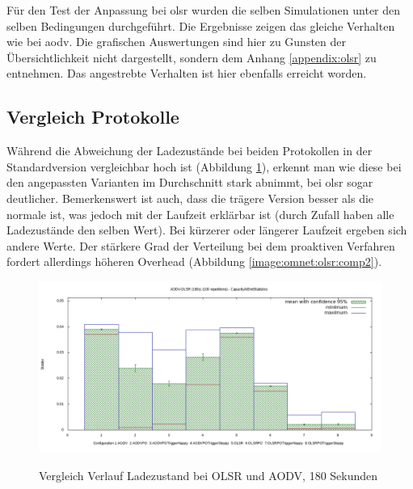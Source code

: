 Für den Test der Anpassung bei \gls{olsr} wurden die selben Simulationen unter den selben Bedingungen durchgeführt. Die Ergebnisse zeigen das gleiche Verhalten wie bei \gls{aodv}. Die grafischen Auswertungen sind hier zu Gunsten der Übersichtlichkeit nicht dargestellt, sondern dem Anhang \ref{appendix:olsr} zu entnehmen. Das angestrebte Verhalten ist hier ebenfalls erreicht worden.

\subsection{Vergleich Protokolle}
\label{chapter:auswertung:vergleich}

Während die Abweichung der Ladezustände bei beiden Protokollen in der Standardversion vergleichbar hoch ist (Abbildung \ref{image:omnet:olsr:comp1}), erkennt man wie diese bei den angepassten Varianten im Durchschnitt stark abnimmt, bei \gls{olsr} sogar deutlicher. Bemerkenswert ist auch, dass die trägere Version besser als die normale ist, was jedoch mit der Laufzeit erklärbar ist (durch Zufall haben alle Ladezustände den selben Wert). Bei kürzerer oder längerer Laufzeit ergeben sich andere Werte. Der stärkere Grad der Verteilung bei dem proaktiven Verfahren fordert allerdings höheren Overhead (Abbildung \ref{image:omnet:olsr:comp2}).\newline

\begin{figure}
  \centering
  \includegraphics[scale=0.45]{bilder/c1.png} \\
  \caption{Vergleich Verlauf Ladezustand bei OLSR und AODV, 180 Sekunden}
  \label{image:omnet:olsr:comp1}
\end{figure}

